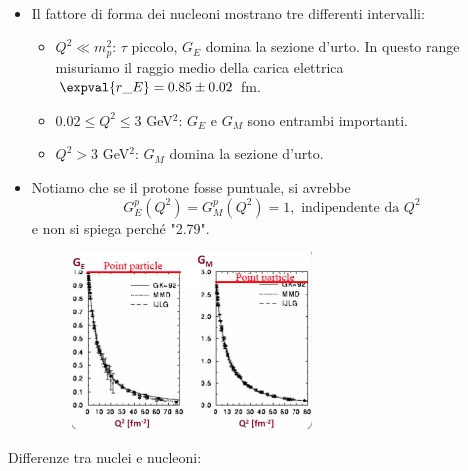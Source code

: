 \begin{itemize}
\begin{gather*}
    \end{gather*}
    \item Il fattore di forma dei nucleoni mostrano tre differenti intervalli:
    \begin{itemize}
        \item $Q^2\ll m_p^2$: $\tau$ piccolo, $G_E$ domina la sezione d'urto. In questo range misuriamo il raggio medio della carica elettrica $\expval{r\_E}=0.85\pm0.02$ fm.
        \item $0.02\leq Q^2\leq3$ GeV$^2$: $G_E$ e $G_M$ sono entrambi importanti. 
        \item $Q^2>3$ GeV$^2$: $G_M$ domina la sezione d'urto. 
    \end{itemize}
    \item Notiamo che se il protone fosse puntuale, si avrebbe
    \begin{equation*}
    G_E^p(Q^2)=G_M^p(Q^2)=1, \text{ indipendente da }Q^2
    \end{equation*}
    e non si spiega perché "2.79".
    \begin{figure}[H]
        \centering
        \includegraphics[width=0.6\textwidth]{immagini/fig_G.png}
    \end{figure}
\end{itemize}
Differenze tra nuclei e nucleoni:
